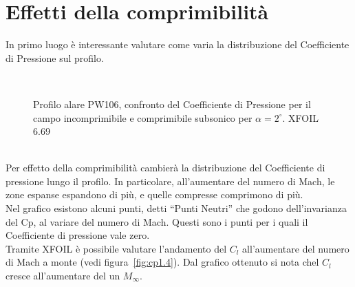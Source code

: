 \section{Effetti della comprimibilità }



In primo luogo è interessante valutare come varia la distribuzione del Coefficiente di Pressione sul profilo.

\noindent \\

\begin{figure} [h!]
\centering
{}
\caption{\footnotesize Profilo alare PW106, confronto del Coefficiente di Pressione per il campo incomprimibile e comprimibile subsonico per $\alpha=2^\circ$. XFOIL 6.69}\label{fig:cp}
\end{figure}

\noindent   \\

Per effetto della comprimibilità cambierà la distribuzione del Coefficiente di pressione lungo il profilo. In particolare, all’aumentare del numero di Mach, le zone espanse espandono di più, e quelle compresse comprimono di più.\\ Nel grafico esistono alcuni punti, detti “Punti Neutri” che godono dell’invarianza del Cp, al variare del numero di Mach. Questi sono i punti per i quali il Coefficiente di pressione vale zero.\\ 

Tramite XFOIL è possibile valutare l’andamento del $C_l$ all’aumentare del numero di Mach a monte (vedi figura~\vref{fig:cp1.4}). %
Dal grafico ottenuto si nota chel $C_l$ cresce all’aumentare del un $M_{\infty}$.


